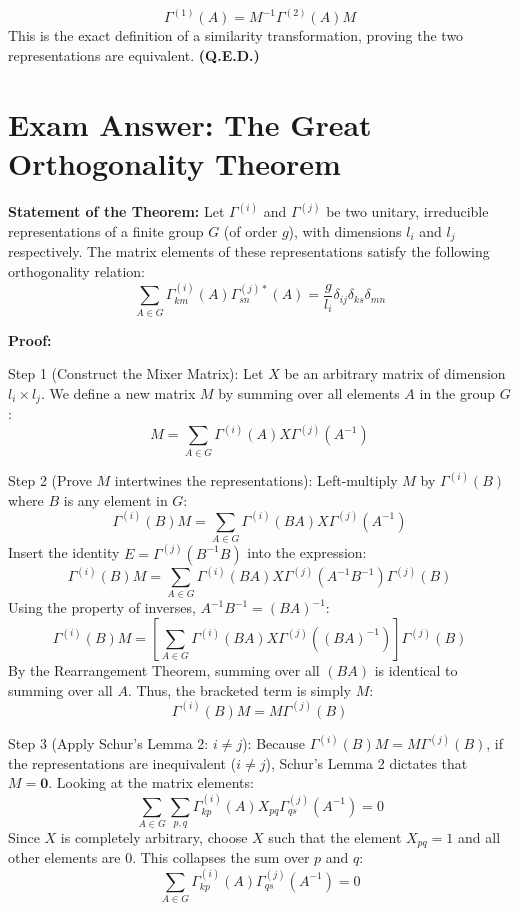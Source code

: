 \documentclass[11pt, a4paper]{report}
\begin{document}
\[
\Gamma^{(1)}(A) = M^{-1} \Gamma^{(2)}(A) M
\]
This is the exact definition of a similarity transformation, proving the two representations are equivalent.
\textbf{(Q.E.D.)}

\newpage
\newpage
\newpage
\newpage
\newpage
\newpage
\newpage
\chapter*{Exam Answer: The Great Orthogonality Theorem}
\textbf{Statement of the Theorem:}
Let $\Gamma^{(i)}$ and $\Gamma^{(j)}$ be two unitary, irreducible representations of a finite group $G$ (of order $g$), with dimensions $l_i$ and $l_j$ respectively. The matrix elements of these representations satisfy the following orthogonality relation:
\[
\sum_{A \in G} \Gamma^{(i)}_{km}(A) \Gamma^{(j)*}_{sn}(A) = \frac{g}{l_i} \delta_{ij} \delta_{ks} \delta_{mn}
\]

\textbf{Proof:}

Step 1 (Construct the Mixer Matrix):
 Let $X$ be an arbitrary matrix of dimension $l_i \times l_j$. We define a new matrix $M$ by summing over all elements $A$ in the group $G$:
\[
M = \sum_{A \in G} \Gamma^{(i)}(A) X \Gamma^{(j)}(A^{-1})
\]

Step 2 (Prove $M$ intertwines the representations):
Left-multiply $M$ by $\Gamma^{(i)}(B)$ where $B$ is any element in $G$:
\[
\Gamma^{(i)}(B) M = \sum_{A \in G} \Gamma^{(i)}(BA) X \Gamma^{(j)}(A^{-1})
\]
Insert the identity $E = \Gamma^{(j)}(B^{-1}B)$ into the expression:
\[
\Gamma^{(i)}(B) M = \sum_{A \in G} \Gamma^{(i)}(BA) X \Gamma^{(j)}(A^{-1}B^{-1}) \Gamma^{(j)}(B)
\]
Using the property of inverses, $A^{-1}B^{-1} = (BA)^{-1}$:
\[
\Gamma^{(i)}(B) M = \left[ \sum_{A \in G} \Gamma^{(i)}(BA) X \Gamma^{(j)}((BA)^{-1}) \right] \Gamma^{(j)}(B)
\]
By the Rearrangement Theorem, summing over all $(BA)$ is identical to summing over all $A$. Thus, the bracketed term is simply $M$:
\[
\Gamma^{(i)}(B) M = M \Gamma^{(j)}(B)
\]

Step 3 (Apply Schur’s Lemma 2: $i \neq j$):
Because $\Gamma^{(i)}(B) M = M \Gamma^{(j)}(B)$, if the representations are inequivalent ($i \neq j$), Schur’s Lemma 2 dictates that $M = \mathbf{0}$. Looking at the matrix elements:
\[
\sum_{A \in G} \sum_{p,q} \Gamma^{(i)}_{kp}(A) X_{pq} \Gamma^{(j)}_{qs}(A^{-1}) = 0
\]
Since $X$ is completely arbitrary, choose $X$ such that the element $X_{pq} = 1$ and all other elements are $0$. This collapses the sum over $p$ and $q$:
\[
\sum_{A \in G} \Gamma^{(i)}_{kp}(A) \Gamma^{(j)}_{qs}(A^{-1}) = 0
\]
\end{document}
